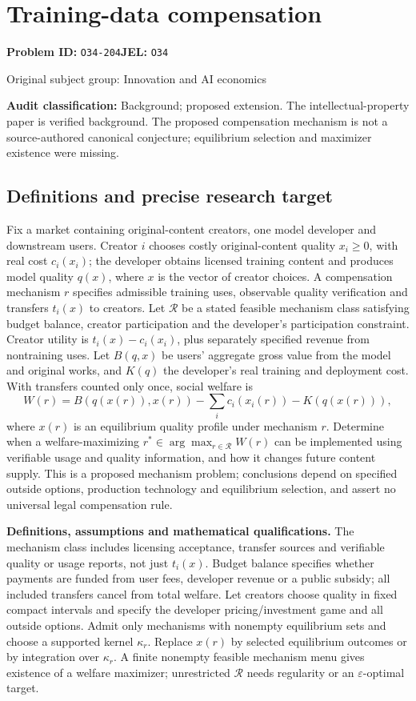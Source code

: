 \documentclass[11pt,a4paper]{article}
\begin{document}
\section*{Training-data compensation}
\textbf{Problem ID:} \texttt{O34-204}\quad \textbf{JEL:} \texttt{O34}\par
\label{problem:OP-0415}
{\sffamily\small\color{muted}Original subject group: Innovation and AI economics\par}
\label{definitions:problem:30007697}
\textbf{Audit classification:} Background; proposed extension. The intellectual-property paper is verified background. The proposed compensation mechanism is not a source-authored canonical conjecture; equilibrium selection and maximizer existence were missing.
\subsection*{Definitions and precise research target}
Fix a market containing original-content creators, one model developer and downstream users. Creator \(i\) chooses costly original-content quality \(x_i\geq0\), with real cost \(c_i(x_i)\); the developer obtains licensed training content and produces model quality \(q(x)\), where \(x\) is the vector of creator choices. A compensation mechanism \(r\) specifies admissible training uses, observable quality verification and transfers \(t_i(x)\) to creators. Let \(\mathcal R\) be a stated feasible mechanism class satisfying budget balance, creator participation and the developer's participation constraint. Creator utility is \(t_i(x)-c_i(x_i)\), plus separately specified revenue from nontraining uses. Let \(B(q,x)\) be users' aggregate gross value from the model and original works, and \(K(q)\) the developer's real training and deployment cost. With transfers counted only once, social welfare is
\[
W(r)=B(q(x(r)),x(r))-\sum_i c_i(x_i(r))-K(q(x(r))),
\]
where \(x(r)\) is an equilibrium quality profile under mechanism \(r\). Determine when a welfare-maximizing \(r^\ast\in\arg\max_{r\in\mathcal R}W(r)\) can be implemented using verifiable usage and quality information, and how it changes future content supply. This is a proposed mechanism problem; conclusions depend on specified outside options, production technology and equilibrium selection, and assert no universal legal compensation rule.

\textbf{Definitions, assumptions and mathematical qualifications.} The mechanism class includes licensing acceptance, transfer sources and verifiable quality or usage reports, not just \(t_i(x)\). Budget balance specifies whether payments are funded from user fees, developer revenue or a public subsidy; all included transfers cancel from total welfare. Let creators choose quality in fixed compact intervals and specify the developer pricing/investment game and all outside options. Admit only mechanisms with nonempty equilibrium sets and choose a supported kernel \(\kappa_r\). Replace \(x(r)\) by selected equilibrium outcomes or by integration over \(\kappa_r\). A finite nonempty feasible mechanism menu gives existence of a welfare maximizer; unrestricted \(\mathcal R\) needs regularity or an \(\varepsilon\)-optimal target.
\end{document}
